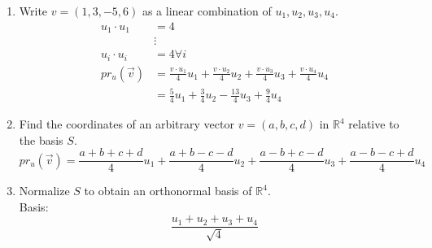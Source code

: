 \documentclass[12pt]{article}
\theoremstyle{definition}
\theoremstyle{plain}
\begin{document}
\begin{enumerate}
\begin{enumerate}
	\item Write $v=(1,3,-5,6)$ as a linear combination of $u_1,u_2,u_3,u_4$.
		\begin{align*}
		u_1\cdot u_1 &= 4\\
		&\vdots\\
		u_i\cdot u_i &= 4 \forall i\\
		pr_u(\vec{v})&=\frac{v\cdot u_1}{4}u_1+\frac{v\cdot u_2}{4}u_2+\frac{v\cdot u_3}{4}u_3+\frac{v\cdot u_4}{4}u_4\\
		&=\frac{5}{4}u_1+\frac{3}{4}u_2-\frac{13}{4}u_3+\frac{9}{4}u_4
		\end{align*}
	\item Find the coordinates of an arbitrary vector $v=(a,b,c,d)$ in $\mathbb{R}^4$ relative to the basis $S$.\\
		\[ pr_u(\vec{v}) = \frac{a+b+c+d}{4}u_1+\frac{a+b-c-d}{4}u_2+\frac{a-b+c-d}{4}u_3+\frac{a-b-c+d}{4}u_4 \]
	\item Normalize $S$ to obtain an orthonormal basis of $\mathbb{R}^4$.\\
		Basis: 
		\[ \frac{u_1+u_2+u_3+u_4}{\sqrt{4}} \]
	\end{enumerate}


\end{enumerate}
\end{document}
